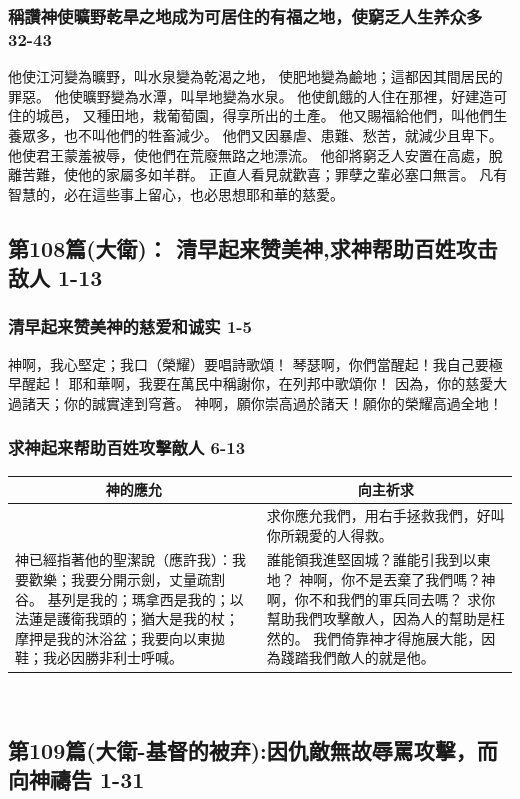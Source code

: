 \subsubsection{稱讚神使曠野乾旱之地成为可居住的有福之地，使窮乏人生养众多 32-43}
他使江河變為曠野，叫水泉變為乾渴之地，
使肥地變為鹼地；這都因其間居民的罪惡。
他使曠野變為水潭，叫旱地變為水泉。
他使飢餓的人住在那裡，好建造可住的城邑，
又種田地，栽葡萄園，得享所出的土產。
他又賜福給他們，叫他們生養眾多，也不叫他們的牲畜減少。
他們又因暴虐、患難、愁苦，就減少且卑下。
他使君王蒙羞被辱，使他們在荒廢無路之地漂流。
他卻將窮乏人安置在高處，脫離苦難，使他的家屬多如羊群。
正直人看見就歡喜；罪孽之輩必塞口無言。
凡有智慧的，必在這些事上留心，也必思想耶和華的慈愛。

\subsection{第108篇(大衛)： 清早起来赞美神,求神帮助百姓攻击敌人 1-13}
\subsubsection{清早起来赞美神的慈爱和诚实 1-5}
神啊，我心堅定；我口（榮耀）要唱詩歌頌！
琴瑟啊，你們當醒起！我自己要極早醒起！
耶和華啊，我要在萬民中稱謝你，在列邦中歌頌你！
因為，你的慈愛大過諸天；你的誠實達到穹蒼。
神啊，願你崇高過於諸天！願你的榮耀高過全地！
\subsubsection{求神起来帮助百姓攻擊敵人 6-13}
\begin{table}[H]
\centering
\begin{tabular}{p{8.5cm}|p{8.75cm}}\hline\hline
\multicolumn{1}{c|}{神的應允}&\multicolumn{1}{c}{向主祈求}\\\hline
&求你應允我們，用右手拯救我們，好叫你所親愛的人得救。\\\hline
神已經指著他的聖潔說（應許我）：我要歡樂；我要分開示劍，丈量疏割谷。
基列是我的；瑪拿西是我的；以法蓮是護衛我頭的；猶大是我的杖；
摩押是我的沐浴盆；我要向以東拋鞋；我必因勝非利士呼喊。
&誰能領我進堅固城？誰能引我到以東地？
神啊，你不是丟棄了我們嗎？神啊，你不和我們的軍兵同去嗎？
求你幫助我們攻擊敵人，因為人的幫助是枉然的。
我們倚靠神才得施展大能，因為踐踏我們敵人的就是他。\\\hline
\end{tabular}
\end{table} 


\subsection{第109篇(大衛-基督的被弃):因仇敵無故辱罵攻擊，而向神禱告 1-31}
